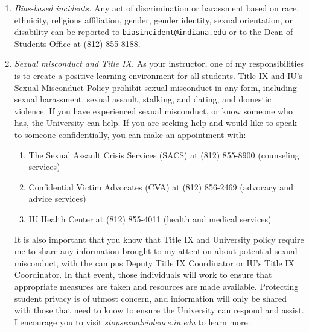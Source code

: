 \documentclass[11pt,article,oneside]{memoir} %
\begin{document}
\begin{enumerate}
\item \emph{Bias-based incidents.} Any act of discrimination or harassment based on 
race, ethnicity, religious affiliation, gender, gender identity, sexual orientation, or
disability can be reported to \texttt{biasincident@indiana.edu} or to the Dean of Students Office at (812) 855-8188. 

\item \emph{Sexual misconduct and Title IX.} As your instructor, one of my
responsibilities is to create a positive learning environment for all students.
Title IX and IU's Sexual Misconduct Policy prohibit sexual misconduct in any
form, including sexual harassment, sexual assault, stalking, and dating, and
domestic violence.  If you have experienced sexual misconduct, or know someone
who has, the University can help. If you are seeking help and would like to
speak to someone confidentially, you can make an appointment with:

\begin{enumerate}

\item The Sexual Assault Crisis Services (SACS) at (812) 855-8900 (counseling services)
\item Confidential Victim Advocates (CVA) at (812) 856-2469 (advocacy and advice services)
\item IU Health Center at (812) 855-4011 (health and medical services)

\end{enumerate}

It is also important that you know that Title IX and University policy require
me to share any information brought to my attention about potential sexual
misconduct, with the campus Deputy Title IX Coordinator or IU's Title IX
Coordinator. In that event, those individuals will work to ensure that
appropriate measures are taken and resources are made available. Protecting
student privacy is of utmost concern, and information will only be shared with
those that need to know to ensure the University can respond and assist. I
encourage you to visit \emph{stopsexualviolence.iu.edu} to learn more.


\end{enumerate}
\end{document}
